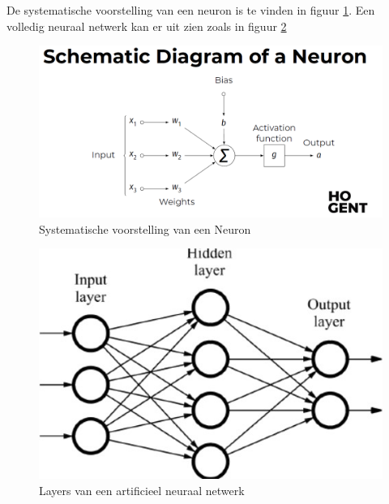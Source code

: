 De systematische voorstelling van een neuron is te vinden in figuur \ref{fig:neuron}.
Een volledig neuraal netwerk kan er uit zien zoals in figuur \ref{fig:layers}

\begin{figure}
    \centering
    \includegraphics[width=1\textwidth]{./img/neuron.png}
    \caption{\label{fig:neuron} Systematische voorstelling van een Neuron \autocite{Lievens2021}}
\end{figure}

\begin{figure}
    \centering
    \includegraphics[width=1\textwidth]{./img/layers.jpg}
    \caption{\label{fig:layers} Layers van een artificieel neuraal netwerk \autocite{Lievens2021}}
\end{figure}

